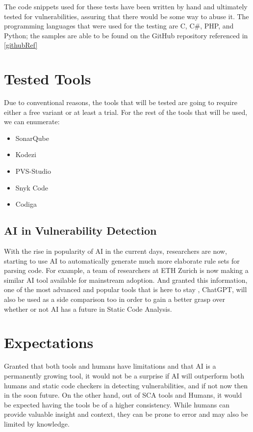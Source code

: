 \noindent The code snippets used for these tests have been written by hand and ultimately tested for vulnerabilities, assuring that there would be some way to abuse it. The programming languages that were used for the testing are C, C\#, PHP, and Python; the samples are able to be found on the GitHub repository referenced in \autoref{githubRef} 

\section{Tested Tools}
Due to conventional reasons, the tools that will be tested are going to require either a free variant or at least a trial. For the rest of the tools that will be used, we can enumerate:
\begin{multicols}{2}
    \begin{itemize}
        \item SonarQube
        \item Kodezi
        \item PVS-Studio
        \item Snyk Code
        \item Codiga
    \end{itemize}
\end{multicols}

\subsection{AI in Vulnerability Detection} \label{chatgpt}
With the rise in popularity of AI in the current days, researchers are now, starting to use AI to automatically generate much more elaborate rule sets for parsing code. For example, a team of researchers at ETH Zurich is now making a similar AI tool available for mainstream adoption. And granted this information, one of the most advanced and popular tools that is here to stay \cite{kasneci2023chatgpt}, ChatGPT, will also be used as a side comparison too in order to gain a better grasp over whether or not AI has a future in Static Code Analysis.

\section{Expectations}
Granted that both tools and humans have limitations and that AI is a permanently growing tool, it would not be a surprise if AI will outperform both humans and static code checkers in detecting vulnerabilities, and if not now then in the soon future. On the other hand, out of SCA tools and Humans, it would be expected having the tools be of a higher consistency. While humans can provide valuable insight and context, they can be prone to error and may also be limited by knowledge.

